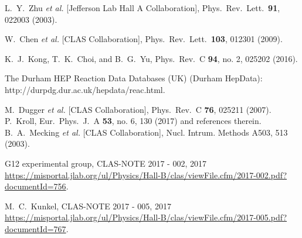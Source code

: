 \documentclass[aps,prc,twocolumn,floatfix,showpacs,preprintnumbers,amsmath,amssymb,superscriptaddress,linenumbers]{revtex4-1}
\begin{document}
\begin{thebibliography}{99}
  L.~Y.~Zhu {\it et al.} [Jefferson Lab Hall A Collaboration],
  Phys.\ Rev.\ Lett.\  {\bf 91}, 022003 (2003).

  W.~Chen {\it et al.} [CLAS Collaboration],
  Phys.\ Rev.\ Lett.\  {\bf 103}, 012301 (2009).

  K.~J.~Kong, T.~K.~Choi, and B.~G.~Yu,
  Phys.\ Rev.\ C {\bf 94}, no. 2, 025202 (2016).

 The Durham HEP Reaction Data Databases (UK) (Durham 
	HepData): http://durpdg.dur.ac.uk/hepdata/reac.html.

  M.~Dugger {\it et al.} [CLAS Collaboration],
  Phys.\ Rev.\ C {\bf 76}, 025211 (2007).
P.~Kroll,
Eur.\ Phys.\ J.\ A {\bf 53}, no. 6, 130 (2017) and references therein.
B.~A.~Mecking {\it et al.} [CLAS Collaboration], 
Nucl. Intrum. Methods A503, 513 (2003).

 G12 experimental group, CLAS-NOTE 2017 - 002, 2017 
	\url{https://misportal.jlab.org/ul/Physics/Hall-B/clas/viewFile.cfm/2017-002.pdf?documentId=756}.

 M.~C.~Kunkel,  CLAS-NOTE 2017 - 005, 2017 
	\url{https://misportal.jlab.org/ul/Physics/Hall-B/clas/viewFile.cfm/2017-005.pdf?documentId=767}.


\end{thebibliography}
\end{document}
